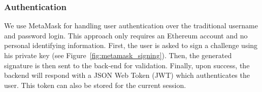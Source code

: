 \subsubsection{Authentication}
We use MetaMask for handling user authentication over the traditional username and password login. This approach only requires an Ethereum account and no personal identifying information.
First, the user is asked to sign a challenge using his private key (see Figure~\ref{fig:metamask_signing}). Then, the generated signature is then sent to the back-end for validation. Finally, upon success, the backend will respond with a JSON Web Token (JWT) which authenticates the user. This token can also be stored for the current session.




%
%
%
%
%
%
